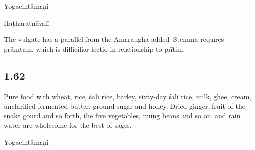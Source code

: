 \begin{ekdosis}
\begin{sources}[hp01_061]
\end{sources}

\begin{testimonia}[hp01_061]
Yogacintāmaṇi

\begin{versinnote}
\end{versinnote}

Haṭharatnāvalī

\begin{versinnote}
\end{versinnote}

\end{testimonia}

\begin{philcomm}[hp01_061]
The vulgate has a parallel from the Amaraugha added. Stemma requires prāṃtam, which is difficilior lectio in relationship to prītiṃ.
\end{philcomm}

\subsection*{1.62}
\begin{translation}[hp01_062]
Pure food with wheat, rice, śāli rice, barley, sixty-day śāli rice, milk, ghee, cream, unclarified fermented butter, ground sugar and honey. Dried ginger, fruit of the snake gourd and so forth, the five vegetables, mung beans and so on, and rain water are wholesome for the best of sages.
\end{translation}

\begin{sources}[hp01_062]
\end{sources}

\begin{testimonia}[hp01_062]
Yogacintāmaṇi

\begin{versinnote}
\end{versinnote}


\end{testimonia}
\end{ekdosis}
